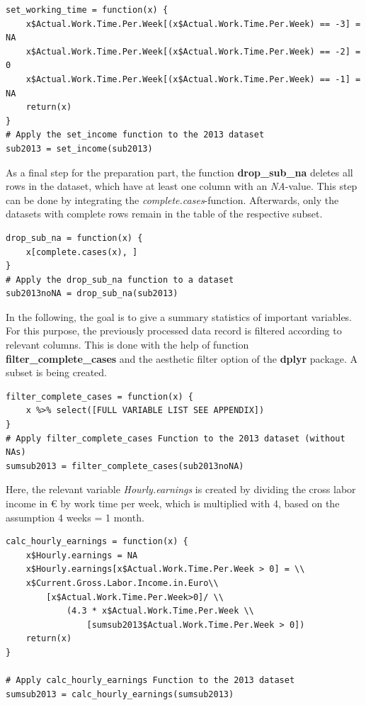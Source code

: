 \documentclass[a4paper]{article}
\begin{document}
\begin{lstlisting}
set_working_time = function(x) {
    x$Actual.Work.Time.Per.Week[(x$Actual.Work.Time.Per.Week) == -3] = NA
    x$Actual.Work.Time.Per.Week[(x$Actual.Work.Time.Per.Week) == -2] = 0
    x$Actual.Work.Time.Per.Week[(x$Actual.Work.Time.Per.Week) == -1] = NA
    return(x)
}
# Apply the set_income function to the 2013 dataset
sub2013 = set_income(sub2013)
\end{lstlisting}
As a final step for the preparation part, the function \textbf{drop\_sub\_na} deletes all rows in the dataset, which have at least one column with an \textit{NA}-value. This step can be done by integrating the \textit{complete.cases}-function. Afterwards, only the datasets with complete rows remain in the table of the respective subset.
\begin{lstlisting}
drop_sub_na = function(x) {
	x[complete.cases(x), ]
}
# Apply the drop_sub_na function to a dataset
sub2013noNA = drop_sub_na(sub2013)
\end{lstlisting}
In the following, the goal is to give a summary statistics of important variables. For this purpose, the previously processed data record is filtered according to relevant columns. This is done with the help of function \textbf{filter\_complete\_cases} and the aesthetic filter option of the \textbf{dplyr} package. A subset is being created.
\begin{lstlisting}
filter_complete_cases = function(x) {
    x %>% select([FULL VARIABLE LIST SEE APPENDIX])
}
# Apply filter_complete_cases Function to the 2013 dataset (without NAs)
sumsub2013 = filter_complete_cases(sub2013noNA)
 \end{lstlisting}
Here, the relevant variable \textit{Hourly.earnings} is created by dividing the cross labor income in \euro{} by work time per week, which is multiplied with 4, based on the assumption 4 weeks = 1 month. 
\begin{lstlisting}
calc_hourly_earnings = function(x) {
    x$Hourly.earnings = NA
    x$Hourly.earnings[x$Actual.Work.Time.Per.Week > 0] = \\
    x$Current.Gross.Labor.Income.in.Euro\\
    	[x$Actual.Work.Time.Per.Week>0]/ \\
    		(4.3 * x$Actual.Work.Time.Per.Week \\
    			[sumsub2013$Actual.Work.Time.Per.Week > 0])
    return(x)
}

# Apply calc_hourly_earnings Function to the 2013 dataset
sumsub2013 = calc_hourly_earnings(sumsub2013)
 \end{lstlisting}
\end{document}
